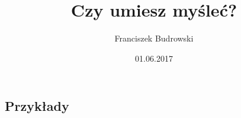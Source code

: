 \documentclass[zad,zawodnik,utf8]{sinol}
\title{Czy umiesz myśleć?}
\author{Franciszek Budrowski} %
\date{01.06.2017}
\begin{document}
\begin{tasktext}

\iffalse
\epigraph{Man wollte sie zu zwanzig Dingen \\ in einem Haus in Danzig zwingen.}{\textit{Erich Mühsam}}
Danzig sei deutsch!
Danzig, gerissen vom Mutterlande,
Stehst du allein nach der Feinde Gebot.
Danzig, du Perle am Ostseestrande,
Weh klingt deine Klage: Deutschtum in Not!
Deutschtum in Not – Danzig in Not!
Im Staube das Banner schwarz-weiß-rot! 
\fi

\section{Przykłady}

\end{tasktext}
\end{document}

